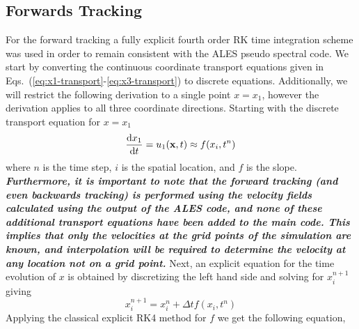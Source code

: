 \subsection{Forwards Tracking}
For the forward tracking a fully explicit fourth order RK time integration
scheme was used in order to remain consistent with the ALES pseudo spectral
code. We start by converting the continuous coordinate transport equations
given in Eqs.~(\ref{eq:x1-transport}-\ref{eq:x3-transport}) to discrete
equations. Additionally, we will restrict the following  derivation to a
single point $x=x_{1}$, however the derivation applies to all three
coordinate directions. Starting with the discrete transport equation for
$x=x_{1}$  
\begin{equation}
    \dv{x_{1}}{t} =  u_{1}(\mathbf{x},t) \approx f(x_{i},t^{n})
    \label{eq:x1-discrete-space}
\end{equation}                               
where $n$ is the time step, $i$ is the spatial location, and $f$ is the
slope.  \emph{\textbf{ Furthermore, it is important to note that the
forward tracking (and even backwards tracking) is performed using the
velocity fields calculated using the output of the ALES code, and none of
these additional transport equations have been added to the main code.
This implies that only the velocities at the grid points of the simulation
are known, and interpolation  will be required to determine the velocity at
any location not on a grid point.}} Next, an explicit equation for the time
evolution of $x$ is obtained by discretizing the left hand side and solving
for
$x^{n+1}_{i}$ giving
\begin{equation}
    x^{n+1}_{i} = x^{n}_{i} + \Delta t f(x_{i},t^{n})
\end{equation}
Applying the classical explicit RK4 method for $f$ we get the following
equation, 
